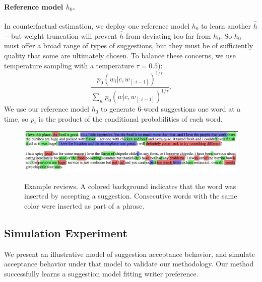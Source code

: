 \documentclass[11pt,letterpaper]{article}
\begin{document}
%
%




%
%






\paragraph{Reference model $h_0$.}
In counterfactual estimation, we deploy one reference model $h_0$ to learn another $\hat{h}$---but weight truncation will prevent $\hat{h}$ from deviating too far from $h_0$. So $h_0$ must offer a broad range of types of suggestions, but they must be of sufficiently quality that some are ultimately chosen. To balance these concerns, we use temperature sampling with a temperature $\tau=0.5$):
$$\frac{p_0(w_i|c, w_{[:i-1]})^{1/\tau}}{\sum_{w} p_0(w|c, w_{[:i-1]})^{1/\tau}}.$$ We use our reference model $h_0$ to generate 6-word suggestions one word at a time, so $p_i$ is the product of the conditional probabilities of each word.%



%
%


\begin{figure}[t]
\centering
\includegraphics[width=\linewidth]{example-review-097745}
\includegraphics[width=\linewidth]{example-review-780313}
%
\caption{\label{fig:example-review} Example reviews. A colored background indicates that the word was inserted by accepting a suggestion. Consecutive words with the same color were inserted as part of a phrase.}
\end{figure}


%

\subsection{Simulation Experiment}
We present an illustrative model of suggestion acceptance behavior, and simulate acceptance behavior under that model to validate our methodology. Our method successfully learns a suggestion model fitting writer preference.
\end{document}
